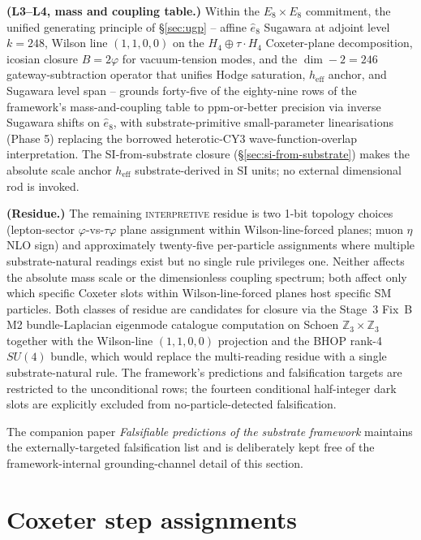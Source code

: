 ﻿\documentclass[reprint,amsmath,amssymb,aps,prd,longbibliography,floatfix]{revtex4-2}
\begin{document}
\textbf{(L3--L4, mass and coupling table.)} Within the
$E_8 \times E_8$ commitment, the unified generating principle of
\S\ref{sec:ugp} -- affine $\widehat{e}_8$ Sugawara at adjoint level
$k = 248$, Wilson line $(1, 1, 0, 0)$ on the $H_4 \oplus \tau \cdot H_4$
Coxeter-plane decomposition, icosian closure $B = 2\varphi$ for
vacuum-tension modes, and the $\dim - 2 = 246$ gateway-subtraction
operator that unifies Hodge saturation, $h_\mathrm{eff}$ anchor, and
Sugawara level span -- grounds forty-five of the eighty-nine rows of
the framework's mass-and-coupling table to ppm-or-better precision via
inverse Sugawara shifts on $\widehat{e}_8$, with substrate-primitive
small-parameter linearisations (Phase 5) replacing the borrowed
heterotic-CY3 wave-function-overlap interpretation. The
SI-from-substrate closure (\S\ref{sec:si-from-substrate}) makes the
absolute scale anchor $h_\mathrm{eff}$ substrate-derived in SI units;
no external dimensional rod is invoked.

\textbf{(Residue.)} The remaining \textsc{interpretive} residue is
two 1-bit topology choices (lepton-sector $\varphi$-vs-$\tau\varphi$
plane assignment within Wilson-line-forced planes; muon $\eta$ NLO
sign) and approximately twenty-five per-particle assignments where
multiple substrate-natural readings exist but no single rule
privileges one. Neither affects the absolute mass scale or the
dimensionless coupling spectrum; both affect only which specific
Coxeter slots within Wilson-line-forced planes host specific SM
particles. Both classes of residue are candidates for closure via
the Stage~3 Fix~B M2 bundle-Laplacian eigenmode catalogue
computation on Schoen $\mathbb{Z}_3 \times \mathbb{Z}_3$ together
with the Wilson-line $(1, 1, 0, 0)$ projection and the BHOP rank-4
$SU(4)$ bundle, which would replace the multi-reading residue with
a single substrate-natural rule. The framework's predictions and
falsification targets are restricted to the unconditional rows; the
fourteen conditional half-integer dark slots are explicitly
excluded from no-particle-detected falsification.

The companion paper \emph{Falsifiable predictions of the substrate
framework} maintains the externally-targeted falsification list and is
deliberately kept free of the framework-internal grounding-channel
detail of this section.

\appendix

\section{Coxeter step assignments}
\label{app:assignments}
\end{document}
